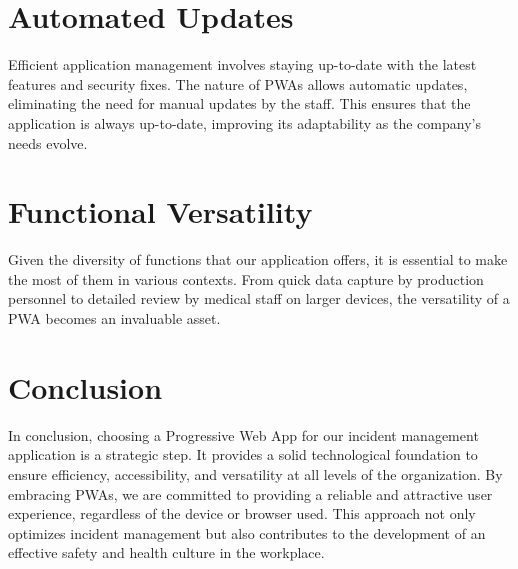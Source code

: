 \documentclass{report}
\begin{document}
\section{Automated Updates}\label{Automated Updates}
Efficient application management involves staying up-to-date with the latest features and security fixes. The nature of PWAs allows automatic updates, eliminating the need for manual updates by the staff. This ensures that the application is always up-to-date, improving its adaptability as the company's needs evolve.
\section{Functional Versatility}\label{Functional Versatility}
Given the diversity of functions that our application offers, it is essential to make the most of them in various contexts. From quick data capture by production personnel to detailed review by medical staff on larger devices, the versatility of a PWA becomes an invaluable asset.

\section{Conclusion}\label{Conclusion}
In conclusion, choosing a Progressive Web App for our incident management application is a strategic step. It provides a solid technological foundation to ensure efficiency, accessibility, and versatility at all levels of the organization. By embracing PWAs, we are committed to providing a reliable and attractive user experience, regardless of the device or browser used. This approach not only optimizes incident management but also contributes to the development of an effective safety and health culture in the workplace.
\end{document}
